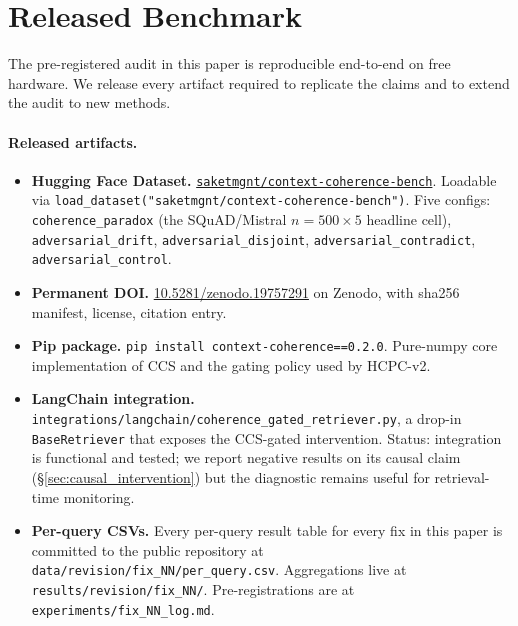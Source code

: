 \section{Released Benchmark}
\label{sec:benchmark}

The pre-registered audit in this paper is reproducible end-to-end
on free hardware. We release every artifact required to replicate
the claims and to extend the audit to new methods.

\paragraph{Released artifacts.}

\begin{itemize}
\itemsep -2pt
\item \textbf{Hugging Face Dataset.}
\href{https://huggingface.co/datasets/saketmgnt/context-coherence-bench}%
{\texttt{saketmgnt/context-coherence-bench}}.
Loadable via \verb|load_dataset("saketmgnt/context-coherence-bench")|.
Five configs:
\texttt{coherence\_paradox} (the SQuAD/Mistral $n{=}500{\times}5$ headline cell),
\texttt{adversarial\_drift}, \texttt{adversarial\_disjoint},
\texttt{adversarial\_contradict}, \texttt{adversarial\_control}.

\item \textbf{Permanent DOI.}
\href{https://doi.org/10.5281/zenodo.19757291}{10.5281/zenodo.19757291}
on Zenodo, with sha256 manifest, license, citation entry.

\item \textbf{Pip package.}
\verb|pip install context-coherence==0.2.0|. Pure-numpy core
implementation of CCS and the gating policy used by HCPC-v2.

\item \textbf{LangChain integration.}
\texttt{integrations/langchain/coherence\_gated\_retriever.py},
a drop-in \texttt{BaseRetriever} that exposes the CCS-gated
intervention. Status: integration is functional and tested; we
report negative results on its causal claim
(\S\ref{sec:causal_intervention}) but the diagnostic remains useful
for retrieval-time monitoring.

\item \textbf{Per-query CSVs.} Every per-query result table for every
fix in this paper is committed to the public repository at
\texttt{data/revision/fix\_NN/per\_query.csv}. Aggregations live at
\texttt{results/revision/fix\_NN/}. Pre-registrations are at
\texttt{experiments/fix\_NN\_log.md}.


\end{itemize}
